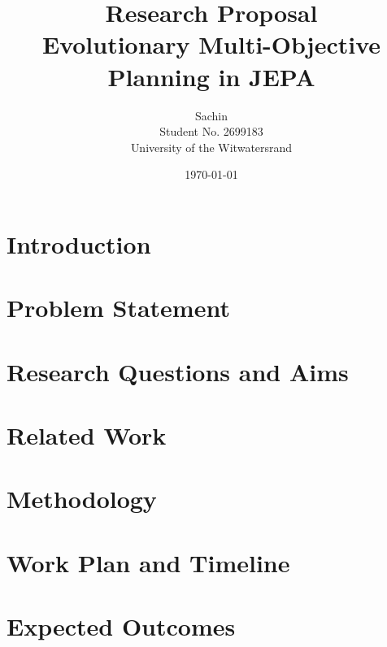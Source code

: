 \documentclass[11pt,a4paper]{article}
\title{Research Proposal\\[0.5em]
  \large Evolutionary Multi-Objective Planning in JEPA}
\author{Sachin \\ Student No. 2699183 \\ University of the Witwatersrand}
\date{\today}
\begin{document}
\maketitle

\begin{abstract}
\end{abstract}

\section{Introduction}

\section{Problem Statement}

\section{Research Questions and Aims}

\section{Related Work}

\section{Methodology}

\section{Work Plan and Timeline}

\section{Expected Outcomes}

\printbibliography[title={References}]
\end{document}
